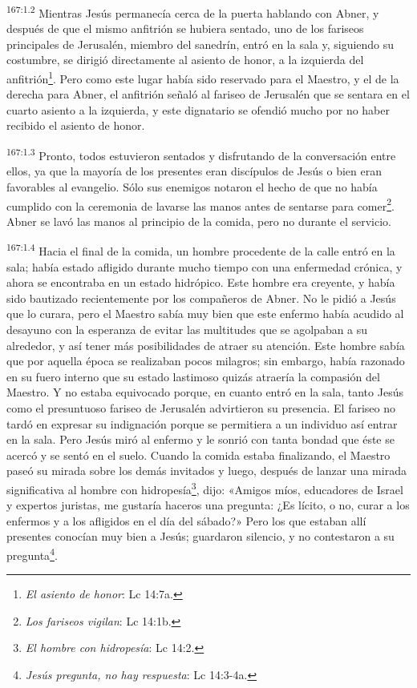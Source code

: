 \par 
\textsuperscript{167:1.2} Mientras Jesús permanecía cerca de la puerta hablando con Abner, y después de que el mismo anfitrión se hubiera sentado, uno de los fariseos principales de Jerusalén, miembro del sanedrín, entró en la sala y, siguiendo su costumbre, se dirigió directamente al asiento de honor, a la izquierda del anfitrión\footnote{\textit{El asiento de honor}: Lc 14:7a.}. Pero como este lugar había sido reservado para el Maestro, y el de la derecha para Abner, el anfitrión señaló al fariseo de Jerusalén que se sentara en el cuarto asiento a la izquierda, y este dignatario se ofendió mucho por no haber recibido el asiento de honor.

\par 
\textsuperscript{167:1.3} Pronto, todos estuvieron sentados y disfrutando de la conversación entre ellos, ya que la mayoría de los presentes eran discípulos de Jesús o bien eran favorables al evangelio. Sólo sus enemigos notaron el hecho de que no había cumplido con la ceremonia de lavarse las manos antes de sentarse para comer\footnote{\textit{Los fariseos vigilan}: Lc 14:1b.}. Abner se lavó las manos al principio de la comida, pero no durante el servicio.

\par 
\textsuperscript{167:1.4} Hacia el final de la comida, un hombre procedente de la calle entró en la sala; había estado afligido durante mucho tiempo con una enfermedad crónica, y ahora se encontraba en un estado hidrópico. Este hombre era creyente, y había sido bautizado recientemente por los compañeros de Abner. No le pidió a Jesús que lo curara, pero el Maestro sabía muy bien que este enfermo había acudido al desayuno con la esperanza de evitar las multitudes que se agolpaban a su alrededor, y así tener más posibilidades de atraer su atención. Este hombre sabía que por aquella época se realizaban pocos milagros; sin embargo, había razonado en su fuero interno que su estado lastimoso quizás atraería la compasión del Maestro. Y no estaba equivocado porque, en cuanto entró en la sala, tanto Jesús como el presuntuoso fariseo de Jerusalén advirtieron su presencia. El fariseo no tardó en expresar su indignación porque se permitiera a un individuo así entrar en la sala. Pero Jesús miró al enfermo y le sonrió con tanta bondad que éste se acercó y se sentó en el suelo. Cuando la comida estaba finalizando, el Maestro paseó su mirada sobre los demás invitados y luego, después de lanzar una mirada significativa al hombre con hidropesía\footnote{\textit{El hombre con hidropesía}: Lc 14:2.}, dijo: «Amigos míos, educadores de Israel y expertos juristas, me gustaría haceros una pregunta: ¿Es lícito, o no, curar a los enfermos y a los afligidos en el día del sábado?» Pero los que estaban allí presentes conocían muy bien a Jesús; guardaron silencio, y no contestaron a su pregunta\footnote{\textit{Jesús pregunta, no hay respuesta}: Lc 14:3-4a.}.


